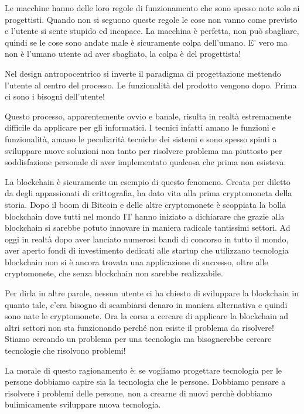 Le macchine hanno delle loro regole di funzionamento che sono spesso note solo ai progettisti. Quando non si seguono queste regole le cose non vanno come previsto e l'utente si sente stupido ed incapace. La macchina è perfetta, non può sbagliare, quindi se le cose sono andate male è sicuramente colpa dell'umano. 
E' vero ma non è l'umano utente ad aver sbagliato, la colpa è del progettista!

Nel design antropocentrico si inverte il paradigma di progettazione mettendo l'utente al centro del processo. Le funzionalità del prodotto vengono dopo. Prima ci sono i bisogni dell'utente!

Questo processo, apparentemente ovvio e banale, risulta in realtà estremamente difficile da applicare per gli informatici. I tecnici infatti amano le funzioni e funzionalità, amano le peculiarità tecniche dei sistemi e sono spesso spinti a sviluppare nuove soluzioni non tanto per risolvere problema ma piuttosto per soddisfazione personale di aver implementato qualcosa che prima non esisteva.

La blockchain è sicuramente un esempio di questo fenomeno. Creata per diletto da degli appassionati di crittografia, ha dato vita alla prima cryptomoneta della storia. Dopo il boom di Bitcoin e delle altre cryptomonete è scoppiata la bolla blockchain dove tutti nel mondo IT hanno iniziato a dichiarare che grazie alla blockchain si sarebbe potuto innovare in maniera radicale tantissimi settori. Ad oggi in realtà dopo aver lanciato numerosi bandi di concorso in tutto il mondo, aver aperto fondi di investimento dedicati alle startup che utilizzano tecnologia blockchain non si è ancora trovata una applicazione di successo, oltre alle cryptomonete, che senza blockchain non sarebbe realizzabile.

Per dirla in altre parole, nessun utente ci ha chiesto di sviluppare la blockchain in quanto tale, c'era bisogno di scambiarsi denaro in maniera alternativa e quindi sono nate le cryptomonete. Ora la corsa a cercare di applicare la blockchain ad altri settori non sta funzionando perché non esiste il problema da risolvere! Stiamo cercando un problema per una tecnologia ma bisognerebbe cercare tecnologie che risolvono problemi!

La morale di questo ragionamento è: se vogliamo progettare tecnologia per le persone dobbiamo capire sia la tecnologia che le persone. Dobbiamo pensare a risolvere i problemi delle persone, non a crearne di nuovi perchè dobbiamo bulimicamente sviluppare nuova tecnologia.


